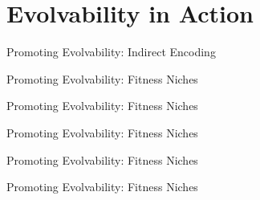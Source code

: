 \section{Evolvability in Action}

\begin{frame}{Promoting Evolvability: Indirect Encoding}
  
\end{frame}

\begin{frame}{Promoting Evolvability: Fitness Niches}
	
\end{frame}

\begin{frame}{Promoting Evolvability: Fitness Niches}
\vfill
	
    \vfill
\end{frame}

\begin{frame}{Promoting Evolvability: Fitness Niches}
\vspace{2ex}
	
\end{frame}

\begin{frame}{Promoting Evolvability: Fitness Niches}
\vspace{2ex}	

\end{frame}

\begin{frame}{Promoting Evolvability: Fitness Niches}
	
\end{frame}
